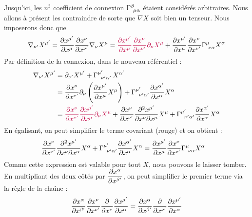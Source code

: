 Jusqu'ici, les $n^3$ coefficient de connexion $\Gamma\indices{^{\beta}_{\!\mu \alpha}}$ étaient considérés arbitraires. Nous allons à présent les contraindre de sorte que $\nabla X$ soit bien un tenseur. Nous imposerons donc que
\begin{align}
    \nabla_{\nu '}X^{\mu '} = \frac{\partial x^{\mu'}}{\partial x^{\mu}}\frac{\partial x^{\nu}}{\partial x^{\nu '}}\nabla_{\nu }X^{\mu }= \textcolor{purple}{\frac{\partial x^{\mu'}}{\partial x^{\mu}}\frac{\partial x^{\nu}}{\partial x^{\nu '}}\partial_{\nu}X^{\mu}} + \frac{\partial x^{\mu'}}{\partial x^{\mu}}\frac{\partial x^{\nu}}{\partial x^{\nu '}}\Gamma\indices{^{\mu }_{\!\nu \alpha}}X^{\alpha }
\end{align}
Par définition de la connexion, dans le nouveau référentiel :
\begin{align}
    \nabla_{\nu '}X^{\mu '} &= \pd_{\nu'} X^{\mu'} + \Gamma\indices{^{\mu'}_{\!\!\nu'\alpha'}}\, X^{\alpha'}\\
    &=\frac{\partial x^{\nu}}{\partial x^{\nu '}}\partial_{\nu}\left(\frac{\partial x^{\mu'}}{\partial x^{\mu}} X^{\mu}\right) + \Gamma\indices{^{\mu '}_{\!\!\nu '\alpha '}}\frac{\partial x^{\alpha '}}{\partial x^{\alpha }} X^{\alpha}\\
    &= \textcolor{purple}{\frac{\partial x^{\nu}}{\partial x^{\nu '}}\frac{\partial x^{\mu'}}{\partial x^{\mu}}\partial_{\nu}X^{\mu}} +\frac{\partial x^{\nu}}{\partial x^{\nu '}}\frac{\partial^2 x^{\mu'}}{\partial x^{\nu} \partial x^{\mu}}X^{\mu}  + \Gamma\indices{^{\mu '}_{\!\!\nu '\alpha '}}\frac{\partial x^{\alpha '}}{\partial x^{\alpha }} X^{\alpha}
\end{align}
En égalisant, on peut simplifier le terme covariant (rouge) et on obtient :
\begin{align}
\label{eq: Connexion tenseur1}
    &\frac{\partial x^{\nu}}{\partial x^{\nu '}}\frac{\partial^2 x^{\mu'}}{\partial x^{\nu} \partial x^{\alpha}}X^{\alpha} + \Gamma\indices{^{\mu '}_{\!\!\nu '\alpha '}}\frac{\partial x^{\alpha '}}{\partial x^{\alpha }} X^{\alpha} = \frac{\partial x^{\mu'}}{\partial x^{\mu}}\frac{\partial x^{\nu}}{\partial x^{\nu '}}\Gamma\indices{^{\mu }_{\!\nu \alpha}}X^{\alpha }
\end{align}
Comme cette expression est valable pour tout $X$, nous pouvons le laisser tomber. En multipliant des deux côtés par $\dfrac{\partial x^\alpha}{\partial x^{\beta'}}$, on peut simplifier le premier terme via la règle de la chaîne :
\begin{align}
    \frac{\partial x^{\alpha}}{\partial x^{\beta '}}  \frac{\partial x^{\nu}}{\partial x^{\nu '}} \frac{\partial}{\partial x^\nu} \frac{\partial x^{\mu'}}{ \partial x^{\alpha}} = \frac{\partial x^{\alpha}}{\partial x^{\beta '}} \frac{\partial}{\partial x^{\nu'}} \frac{\partial x^{\mu'}}{ \partial x^{\alpha}}
\end{align}
